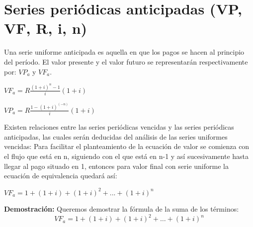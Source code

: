 








	

	\section{Series periódicas anticipadas (VP, VF, R, i, n)}

	Una serie uniforme anticipada es aquella en que los pagos se hacen al principio del período. El valor presente y el valor futuro se representarán respectivamente por: $VP_{a}$ y $VF_{a}$.

\begin{center}

$VF_{a}=R \frac{(1+i)^{n}-1}{i}(1+i) $ \hspace{35pt}{ Valor  futuro de una serie  uniforme  anticipada}

$VP_{a}=R \frac{1-(1+i)^{(-n)}}{i}(1+i)$
	\hspace{30pt}{Valor de una presente  serie  uniforme  anticipada}\\
 \end{center}	


	Existen relaciones entre las series periódicas vencidas y las series periódicas anticipadas, las cuales serán deducidas del análisis de las series uniformes vencidas: Para facilitar el planteamiento de la ecuación de valor se comienza con el flujo que está en n, siguiendo con el que está en n-1 y así sucesivamente hasta llegar al pago situado en 1, entonces para valor final con serie uniforme la ecuación de equivalencia quedará así:

	\vspace{5mm}
\begin{center}
$VF_{a}=1+ (1+i) +(1+i)^{2}+...+(1+i)^{n} $ \\

\end{center}

\textbf{Demostración:}
Queremos demostrar la fórmula de la suma de los términos:
\[
VF_{a} = 1 + (1+i) + (1+i)^2 + \dots + (1+i)^n
\]

